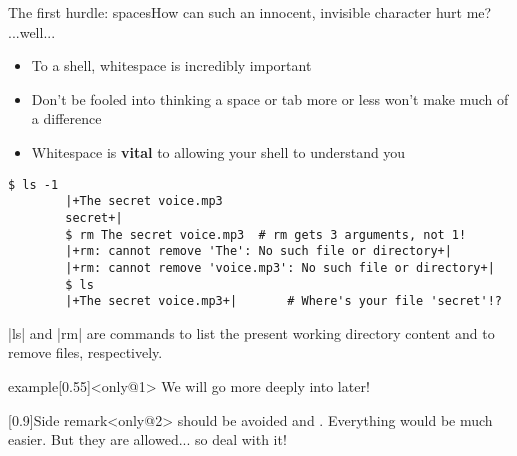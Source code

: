 \begin{frame}[fragile]{The first hurdle: spaces}{How can such an innocent, invisible character hurt me? ...well...}
    \vspace{-1mm}
    \begin{itemize}
        \item To a shell, whitespace is incredibly important
        \item Don't be fooled into thinking a space or tab more or less won't make much of a difference
        \item  Whitespace is \textbf{vital} to allowing your shell to understand you
    \end{itemize}
    \begin{lstlisting}[style=MyBash, aboveskip=4mm]
        $ ls -1
        |+The secret voice.mp3
        secret+|
        $ rm The secret voice.mp3  # rm gets 3 arguments, not 1!
        |+rm: cannot remove 'The': No such file or directory+|
        |+rm: cannot remove 'voice.mp3': No such file or directory+|
        $ ls
        |+The secret voice.mp3+|       # Where's your file 'secret'!?
    \end{lstlisting}
    \centerline{\ssmall \bash|ls| and \bash|rm| are commands to list the present working directory content and to remove files, respectively.}
    \begin{overlayarea}{\textwidth}{0.3\textheight}
        \begin{varblock}{example}[0.55\textwidth]{}<only@1>
            We will go more deeply into  later!
        \end{varblock}
        \begin{varblock}{}[0.9\textwidth]{Side remark}<only@2>
             should be avoided and . Everything would be much easier. But they are allowed... so deal with it!
        \end{varblock}
    \end{overlayarea}
\end{frame}
